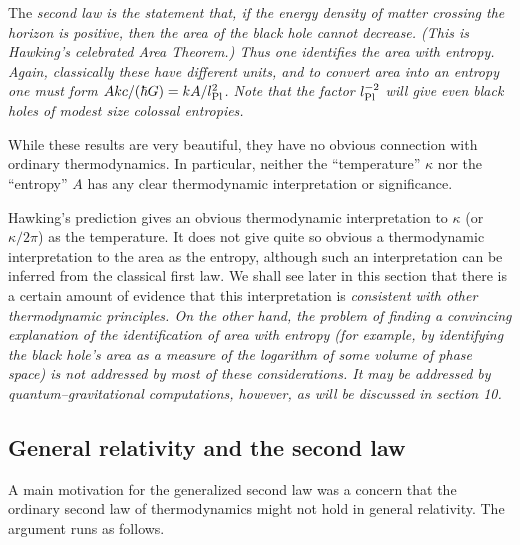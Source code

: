 The \it second law \rm is the statement that, if the energy density of matter
crossing the horizon is positive, then the area of the black hole cannot
decrease.  (This is Hawking's celebrated \it Area Theorem.\rm ) Thus one
identifies the area with entropy. Again, classically these have different
units, and to convert area into an entropy one must form $Akc/(\hbar
G)=kA/l_{\rm Pl}^2$.  Note that the factor $l_{\rm Pl}^{-2}$ will give even
black holes of modest size colossal entropies.  

While these results are very beautiful, they have no obvious connection with
ordinary thermodynamics.  In particular, neither the ``temperature'' $\kappa$
nor the ``entropy'' $A$ has any clear thermodynamic interpretation or
significance.

Hawking's prediction gives an obvious thermodynamic interpretation to
$\kappa$ (or $\kappa /2\pi$)
as the temperature.  It does not give quite so obvious a
thermodynamic interpretation to the area as the entropy, although such
an interpretation can be inferred from the classical first law.  We
shall see later in this section that there is a certain amount of
evidence that this interpretation is \it consistent \rm with other
thermodynamic principles.  On the other hand, the problem of
finding a convincing \it explanation \rm of the identification of area
with entropy (for example, by identifying the black hole's area as a
measure of the logarithm of some volume of phase space) is not
addressed by most of these considerations.  It may be addressed by
quantum--gravitational computations, however, as will be discussed in
section 10.

\subsection{General relativity and the second law}

A main motivation for the generalized second law was a concern that the
ordinary second law of thermodynamics might not hold in general relativity.  
The argument runs as follows.

